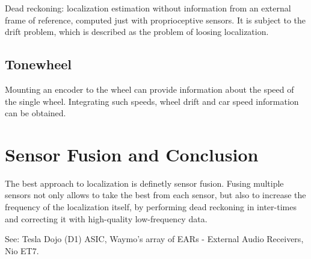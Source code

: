 Dead reckoning: localization estimation without information from an external frame of reference, computed just with proprioceptive sensors.
It is subject to the drift problem, which is described as the problem of loosing localization.

\subsection{Tonewheel}
Mounting an encoder to the wheel can provide information about the speed of the single wheel. Integrating such speeds, wheel drift and car speed information can be obtained.

\section{Sensor Fusion and Conclusion}
The best approach to localization is definetly sensor fusion.
Fusing multiple sensors not only allows to take the best from each sensor, but also to increase the frequency of the localization itself, by performing dead reckoning in inter-times and correcting it with high-quality low-frequency data.

See: Tesla Dojo (D1) ASIC, Waymo's array of EARs - External Audio Receivers, Nio ET7.

